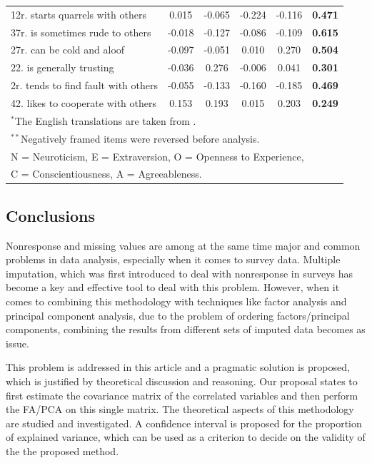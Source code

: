 \documentclass[11pt,a5paper,twoside]{book}
\begin{document}
\begin{table}[ht]
{\begin{tabular}{lccccc}
12r. starts quarrels with others & 0.015 & -0.065 & -0.224 & -0.116 & \textbf{0.471} \\ 
37r. is sometimes rude to others & -0.018 & -0.127 & -0.086 & -0.109 & \textbf{0.615} \\ 
27r. can be cold and aloof & -0.097 & -0.051 & 0.010 & 0.270 & \textbf{0.504} \\ 
22. is generally trusting & -0.036 & 0.276 & -0.006 & 0.041 & \textbf{0.301} \\ 
2r. tends to find fault with others & -0.055 & -0.133 & -0.160 & -0.185 & \textbf{0.469} \\ 
42. likes to cooperate with others & 0.153 & 0.193 & 0.015 & 0.203 & \textbf{0.249} \\ 
\hline 
\multicolumn{6}{l}{$^*${\small{The English translations are taken from \cite{denissen2008}.}}}\\ 
\multicolumn{6}{l}{$^{**}${\small{Negatively framed items were reversed before analysis.}}}\\ 
\multicolumn{6}{l}{{\small{N = Neuroticism, E = Extraversion, O = Openness to Experience,}}}\\ 
\multicolumn{6}{l}{{\small{C = Conscientiousness, A = Agreeableness.}}}\\ 
   \hline\hline
\end{tabular}}
\end{table}

\subsection{Conclusions}
\label{sec_conclusion}
Nonresponse and missing values are among at the same time major and common problems in data analysis, especially when it comes to survey data. Multiple imputation, which was first introduced to deal with nonresponse in surveys \citep{rubin2004} has become a key and effective tool to deal with this problem. However, when it comes to combining this methodology with techniques like factor analysis and principal component analysis, due to the problem of ordering factors/principal components, combining the results from different sets of imputed data becomes as issue.

This problem is addressed in this article and a pragmatic solution is proposed, which is justified by theoretical discussion and reasoning. Our proposal states to first estimate the covariance matrix of the correlated variables and then perform the FA/PCA on this single matrix. The theoretical aspects of this methodology are studied and investigated. A confidence interval is proposed for the proportion of explained variance, which can be used as a criterion to decide on the validity of the the proposed method. 
\end{document}
